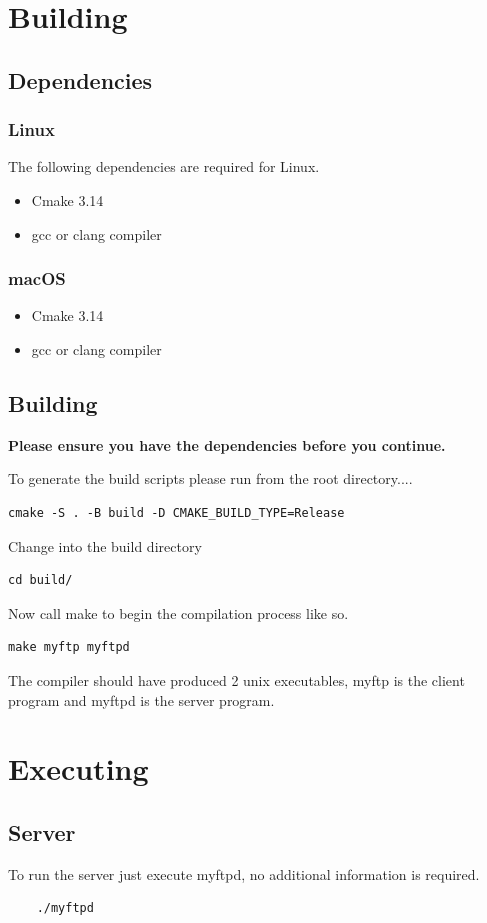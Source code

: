 \documentclass{article}
\begin{document}
\section{Building}
\subsection{Dependencies}
\subsubsection*{Linux}
The following dependencies are required for Linux.
\begin{itemize}
    \item Cmake 3.14
    \item gcc or clang compiler
\end{itemize}
\subsubsection*{macOS}
\begin{itemize}
    \item Cmake 3.14
    \item gcc or clang compiler
\end{itemize}
\subsection{Building}
\begin{center}
\textbf{Please ensure you have the dependencies before you continue.}
\end{center}
To generate the build scripts please run from the root directory....
\begin{lstlisting}
cmake -S . -B build -D CMAKE_BUILD_TYPE=Release    
\end{lstlisting}
Change into the build directory
\begin{lstlisting}
cd build/    
\end{lstlisting}
Now call make to begin the compilation process like so.
\begin{lstlisting}
make myftp myftpd    
\end{lstlisting}
The compiler should have produced 2 unix executables, myftp is the client program and myftpd is the server program.
\section{Executing}
\subsection{Server}
To run the server just execute myftpd, no additional information is required.
\begin{lstlisting}
    ./myftpd
\end{lstlisting}
\end{document}
